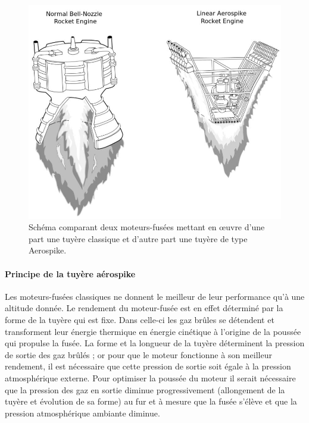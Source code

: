 \documentclass{report}
\begin{document}
\begin{figure}[h!]
    \centering
    \includegraphics[scale=0.5]{50.JPG}
    \caption{Schéma comparant deux moteurs-fusées mettant en œuvre d'une part une tuyère classique et d'autre part une tuyère de type Aerospike.}
    \label{50}
\end{figure}

\paragraph{Principe de la tuyère aérospike}

Les moteurs-fusées classiques ne donnent le meilleur de leur performance qu'à une altitude donnée. Le rendement du moteur-fusée est en effet déterminé par la forme de la tuyère qui est fixe. Dans celle-ci les gaz brûles se détendent et transforment leur énergie thermique en énergie cinétique à l'origine de la poussée qui propulse la fusée. La forme et la longueur de la tuyère déterminent la pression de sortie des gaz brûlés ; or pour que le moteur fonctionne à son meilleur rendement, il est nécessaire que cette pression de sortie soit égale à la pression atmosphérique externe. Pour optimiser la poussée du moteur il serait nécessaire que la pression des gaz en sortie diminue progressivement (allongement de la tuyère et évolution de sa forme) au fur et à mesure que la fusée s'élève et que la pression atmosphérique ambiante diminue.
\end{document}
